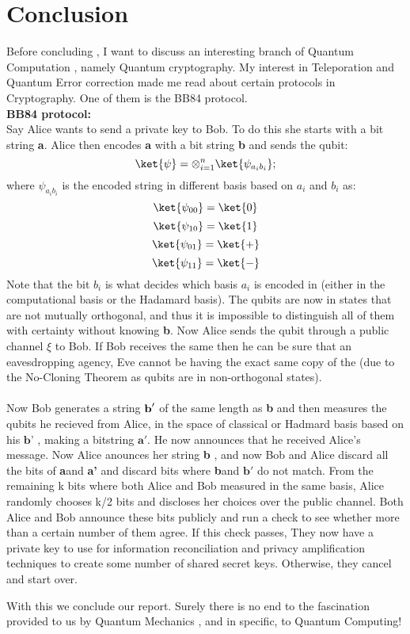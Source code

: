 \section{Conclusion}
Before concluding , I want to discuss an interesting branch of Quantum Computation , namely Quantum cryptography. My interest in Teleporation and Quantum Error correction made me read about certain protocols in Cryptography. One of them is the BB84 protocol.\\
\textbf{BB84 protocol:}\\
Say Alice wants to send a private key to Bob. To do this she starts with a bit string \textbf{a}. Alice then encodes \textbf{a} with a bit string \textbf{b} and sends the qubit:
$$\ket{\psi} = \otimes_{i=1}^{n} \ket{\psi_{a_ib_i}};
$$
where $\psi_{a_ib_i}$ is the encoded string in different basis based on $a_i$ and $b_i$ as:
$$\ket{\psi_{00}}= \ket{0}$$
$$\ket{\psi_{10}}= \ket{1}$$
$$\ket{\psi_{01}}=\ket{+}$$
$$\ket{\psi_{11}}=\ket{-}$$
Note that the bit \textbf{$b_i$} is what decides which basis \textbf{$a_i$} is encoded in (either in the computational basis or the Hadamard basis). The qubits are now in states that are not mutually orthogonal, and thus it is impossible to distinguish all of them with certainty without knowing \textbf{b}.
Now Alice sends the qubit through a public channel $\xi$ to Bob. If Bob receives the same then he can be sure that an eavesdropping agency, Eve cannot be having the exact same copy of the (due to the No-Cloning Theorem as qubits are in non-orthogonal states). \\ \\
Now Bob generates a string $\text{\textbf{b}}'$ of the same length as \textbf{b} and then measures the qubits he recieved from Alice, in the space of classical or Hadmard basis based on his $\textbf{b'}$ , making a bitstring $\textbf{a}'$. He now announces that he received Alice's message. Now Alice anounces her string \textbf{b} , and now Bob and Alice discard all the bits of \textbf{a}and \textbf{a'} and discard bits where \textbf{b}and $\textbf{b}'$ do not match. \newline \newline
From the remaining k bits where both Alice and Bob measured in the same basis, Alice randomly chooses k/2 bits and discloses her choices over the public channel. Both Alice and Bob announce these bits publicly and run a check to see whether more than a certain number of them agree. If this check passes, They now have a private key to use for information reconciliation and privacy amplification techniques to create some number of shared secret keys. Otherwise, they cancel and start over.

\newline
\newline
With this we conclude our report. Surely there is no end to the fascination provided to us by Quantum Mechanics , and in specific, to Quantum Computing!